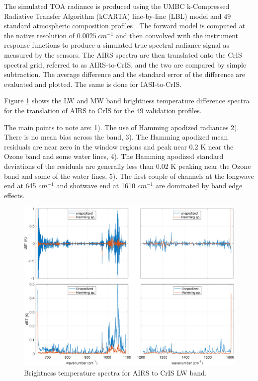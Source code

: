 \documentclass[twocolumn,10pt]{article}
\begin{document}
The simulated TOA radiance is produced using the UMBC k-Compressed Radiative Transfer Algorithm (kCARTA) line-by-line (LBL) model \cite{kcarta1998} and 49 standard atmospheric composition profiles \cite{TIGR1998}. The forward model is computed at the native resolution of $0.0025\ cm^{-1}$ and then convolved with the instrument response functions to produce a simulated true spectral radiance signal as measured by the sensors. The AIRS spectra are then translated onto the CrIS spectral grid, referred to as AIRS-to-CrIS, and the two are compared by simple subtraction. The average difference and the standard error of the difference are evaluated and plotted. The same is done for IASI-to-CrIS. 

Figure \ref{fig:1a} shows the LW and MW band brightness temperature difference spectra for the translation of AIRS to CrIS for the 49 validation profiles.

The main points to note are: 1). The use of Hamming apodized radiances 2). There is no mean bias across the band, 3). The Hamming apodized mean residuals are near zero in the window regions and peak near 0.2 K near the Ozone band and some water lines, 4). The Hamming apodized standard deviations of the residuals are generally less than 0.02 K peaking near the Ozone band and some of the water lines, 5). The first couple of channels at the longwave end at 645 $cm^{-1}$ and shotwave end at 1610 $cm^{-1}$ are dominated by band edge effects.

\begin{figure}[htb]
\centering
\includegraphics[width=\linewidth]{./figs/airs2cris_validation_lw_mw.pdf}
\caption{
  Brightness temperature spectra for AIRS to CrIS LW band.}
\label{fig:1a}
\end{figure}
\end{document}
